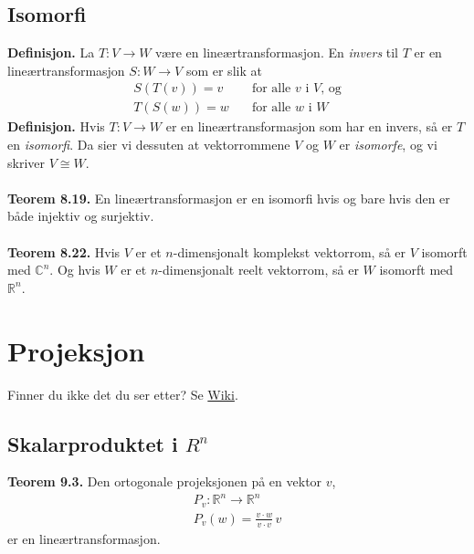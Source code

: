\documentclass{article}
\begin{document}
\subsection{Isomorfi}
\textbf{Definisjon.} La $T: V \rightarrow W$ være en lineærtransformasjon. En \textit{invers} til $T$ er en lineærtransformasjon $S: W \rightarrow V$ som er slik at
\begin{align*}
    S(T(v)) = v \quad &\text{for alle } v \text{ i } V \text{, og} \\
    T(S(w)) = w \quad &\text{for alle } w \text{ i } W
\end{align*}
\textbf{Definisjon.} Hvis $T: V \rightarrow W$ er en lineærtransformasjon som har en invers, så er $T$ en \textit{isomorfi}. Da sier vi dessuten at vektorrommene $V$ og $W$ er \textit{isomorfe}, og vi skriver $V \cong W$.
\\\\
\textbf{Teorem 8.19.} En lineærtransformasjon er en isomorfi hvis og bare hvis den er både injektiv og surjektiv.
\\\\
\textbf{Teorem 8.22.} Hvis $V$ er et $n$-dimensjonalt komplekst vektorrom, så er $V$ isomorft med $\mathbb{C}^n$. Og hvis $W$ er et $n$-dimensjonalt reelt vektorrom, så er $W$ isomorft med $\mathbb{R}^n$.




\clearpage
\section{Projeksjon}
Finner du ikke det du ser etter? Se \href{https://www.math.ntnu.no/emner/TMA4110/2020h/notater/9-projeksjon.pdf}{Wiki}.


\subsection{Skalarproduktet i $R^n$}
\textbf{Teorem 9.3.} Den ortogonale projeksjonen på en vektor $v$,
\begin{gather*}
    P_v : \mathbb{R}^n \rightarrow \mathbb{R}^n \\
    P_v(w)=\frac{v \cdot w}{v \cdot v}\,v
\end{gather*}
er en lineærtransformasjon.
\end{document}
